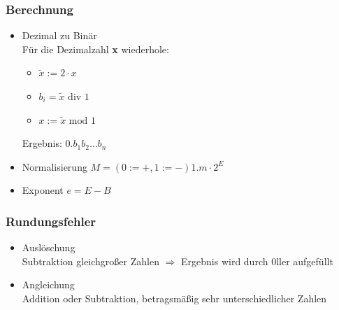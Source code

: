 \subsubsection*{Berechnung}
\begin{itemize}

	\item Dezimal zu Binär \\
	Für die Dezimalzahl \textbf{x} wiederhole:
	\begin{itemize}
		\item $\widetilde{x} := 2 \cdot x$
		\item $b_i = \widetilde{x}\text{ div }1$
		\item $x := \widetilde{x}\text{ mod }1$
	\end{itemize}
	Ergebnis: $0.b_1b_2...b_n$
	
	\item Normalisierung $M = (0:=+, 1:=-) 1.m \cdot 2^E$ \\
	
	\item Exponent $e = E - B$ \\

\end{itemize}

\subsubsection*{Rundungsfehler}
\begin{itemize}

	\item Auslöschung \\
	Subtraktion gleichgroßer Zahlen $\Rightarrow$ Ergebnis wird durch 0ller aufgefüllt
	
	\item Angleichung \\
	Addition oder Subtraktion, betragsmäßig sehr unterschiedlicher Zahlen

\end{itemize}

